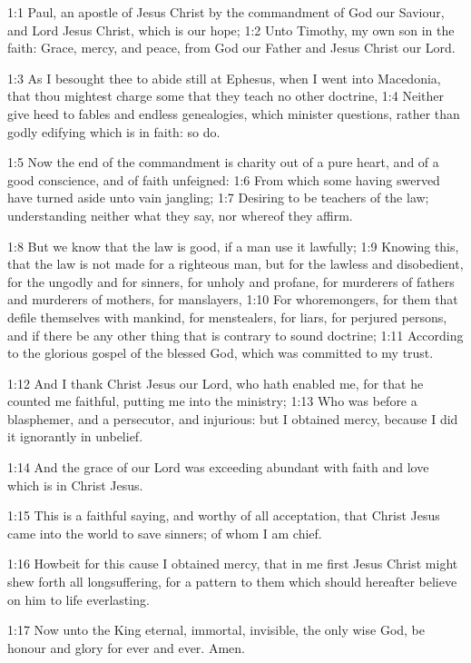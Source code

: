 

1:1 Paul, an apostle of Jesus Christ by the commandment of God our
Saviour, and Lord Jesus Christ, which is our hope; 1:2 Unto Timothy,
my own son in the faith: Grace, mercy, and peace, from God our Father
and Jesus Christ our Lord.

1:3 As I besought thee to abide still at Ephesus, when I went into
Macedonia, that thou mightest charge some that they teach no other
doctrine, 1:4 Neither give heed to fables and endless genealogies,
which minister questions, rather than godly edifying which is in
faith: so do.

1:5 Now the end of the commandment is charity out of a pure heart, and
of a good conscience, and of faith unfeigned: 1:6 From which some
having swerved have turned aside unto vain jangling; 1:7 Desiring to
be teachers of the law; understanding neither what they say, nor
whereof they affirm.

1:8 But we know that the law is good, if a man use it lawfully; 1:9
Knowing this, that the law is not made for a righteous man, but for
the lawless and disobedient, for the ungodly and for sinners, for
unholy and profane, for murderers of fathers and murderers of mothers,
for manslayers, 1:10 For whoremongers, for them that defile themselves
with mankind, for menstealers, for liars, for perjured persons, and if
there be any other thing that is contrary to sound doctrine; 1:11
According to the glorious gospel of the blessed God, which was
committed to my trust.

1:12 And I thank Christ Jesus our Lord, who hath enabled me, for that
he counted me faithful, putting me into the ministry; 1:13 Who was
before a blasphemer, and a persecutor, and injurious: but I obtained
mercy, because I did it ignorantly in unbelief.

1:14 And the grace of our Lord was exceeding abundant with faith and
love which is in Christ Jesus.

1:15 This is a faithful saying, and worthy of all acceptation, that
Christ Jesus came into the world to save sinners; of whom I am chief.

1:16 Howbeit for this cause I obtained mercy, that in me first Jesus
Christ might shew forth all longsuffering, for a pattern to them which
should hereafter believe on him to life everlasting.

1:17 Now unto the King eternal, immortal, invisible, the only wise
God, be honour and glory for ever and ever. Amen.

